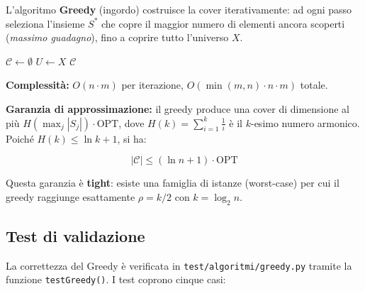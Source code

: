 \documentclass[12pt, a4paper]{article}
\begin{document}
L'algoritmo \textbf{Greedy} (ingordo) costruisce la cover iterativamente: ad ogni passo 
seleziona l'insieme $S^*$ che copre il maggior numero di elementi ancora 
scoperti (\textit{massimo guadagno}), fino a coprire tutto l'universo $X$.

\begin{algorithm}[H]
\caption{Greedy Set Cover - pseudocodice}
$\mathcal{C} \leftarrow \emptyset$\;
$U \leftarrow X$ 
\Return $\mathcal{C}$\;
\end{algorithm}

\textbf{Complessità:} $O(n \cdot m)$ per iterazione, $O(\min(m,n) \cdot n \cdot m)$ totale.

\textbf{Garanzia di approssimazione:} il greedy produce una cover di dimensione 
al più $H(\max_j|S_j|) \cdot \mathrm{OPT}$, dove $H(k) = \sum_{i=1}^k \frac{1}{i}$ 
è il $k$-esimo numero armonico. Poiché $H(k) \leq \ln k + 1$, si ha:

$$|\mathcal{C}| \leq (\ln n + 1) \cdot \mathrm{OPT}$$

Questa garanzia è \textbf{tight}: esiste una famiglia di istanze (worst-case) 
per cui il greedy raggiunge esattamente $\rho = k/2$ con $k = \log_2 n$.

\subsection*{Test di validazione}

La correttezza del Greedy è verificata in \texttt{test/algoritmi/greedy.py}
tramite la funzione \texttt{testGreedy()}. I test coprono cinque casi:
\end{document}
